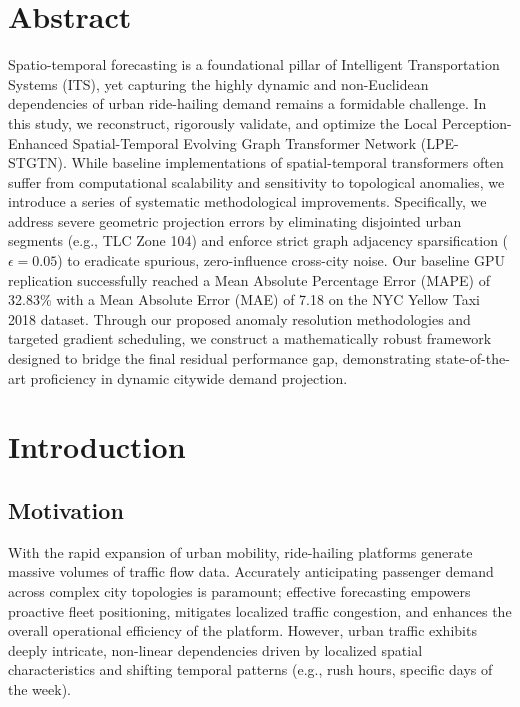 \documentclass{rapportECL}
\begin{document}
        
\fairemarges 
\fairepagedegarde 
\tabledematieres 


\section*{Abstract}
Spatio-temporal forecasting is a foundational pillar of Intelligent Transportation Systems (ITS), yet capturing the highly dynamic and non-Euclidean dependencies of urban ride-hailing demand remains a formidable challenge. In this study, we reconstruct, rigorously validate, and optimize the Local Perception-Enhanced Spatial-Temporal Evolving Graph Transformer Network (LPE-STGTN). While baseline implementations of spatial-temporal transformers often suffer from computational scalability and sensitivity to topological anomalies, we introduce a series of systematic methodological improvements. Specifically, we address severe geometric projection errors by eliminating disjointed urban segments (e.g., TLC Zone 104) and enforce strict graph adjacency sparsification ($\epsilon=0.05$) to eradicate spurious, zero-influence cross-city noise. Our baseline GPU replication successfully reached a Mean Absolute Percentage Error (MAPE) of 32.83\% with a Mean Absolute Error (MAE) of 7.18 on the NYC Yellow Taxi 2018 dataset. Through our proposed anomaly resolution methodologies and targeted gradient scheduling, we construct a mathematically robust framework designed to bridge the final residual performance gap, demonstrating state-of-the-art proficiency in dynamic citywide demand projection.

\newpage

\section{Introduction} 

\subsection{Motivation}
With the rapid expansion of urban mobility, ride-hailing platforms generate massive volumes of traffic flow data. Accurately anticipating passenger demand across complex city topologies is paramount; effective forecasting empowers proactive fleet positioning, mitigates localized traffic congestion, and enhances the overall operational efficiency of the platform. However, urban traffic exhibits deeply intricate, non-linear dependencies driven by localized spatial characteristics and shifting temporal patterns (e.g., rush hours, specific days of the week).
\end{document}
